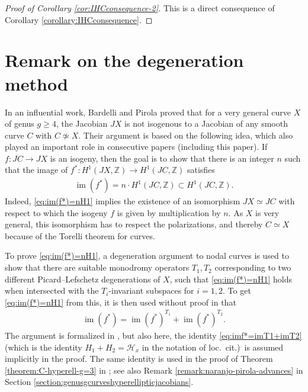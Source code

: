 \documentclass[a4paper,11pt,reqno]{amsart}
\numberwithin{equation}{section}
\theoremstyle{plain}
\theoremstyle{definition}
\newcommand{\Z}{\mathbb Z}
\newcommand{\im}{\operatorname{im}}
\renewcommand{\cong}{\simeq}
\begin{document}
\begin{proof}[Proof of Corollary \ref{cor:IHCconsequence-2}]
    This is a direct consequence of Corollary \ref{corollary:IHCconsequence}.
\end{proof}

\appendix

\section{Remark on the degeneration method} 

\label{appendix}

In an influential work, Bardelli and Pirola \cite{bardellipirola-curvesofgenusg} proved that for a very general curve $X$ of genus $g\geq 4$, the Jacobian $JX$ is not isogenous to a Jacobian of any smooth curve $C$ with $C\not \cong X$.
Their argument is based on the following idea, which also played an important role in consecutive papers (including this paper). 
If $f \colon JC\to JX$ is an isogeny, then the goal is to show that there is an integer $n$ such that the image of $f^\ast \colon H^1(JX,\Z)\to H^1(JC,\Z)$ satisfies
\begin{align}\label{eq:im(f*)=nH1}
    \im(f^\ast)=n\cdot H^1(JC,\Z)\subset H^1(JC,\Z).
    \end{align}
Indeed, \eqref{eq:im(f*)=nH1} implies the existence of an isomorphism $JX\cong JC$ with respect to which the isogeny $f$ is given by multiplication by $n$. As $X$ is very general, this isomorphism has to respect the polarizations, and thereby $C \cong X$ because of the Torelli theorem for curves. 
 
    To prove \eqref{eq:im(f*)=nH1}, 
    a degeneration argument to nodal curves is used to show that there are suitable monodromy operators $T_1,T_2$ corresponding to two different Picard--Lefschetz degenerations of $X$, such that \eqref{eq:im(f*)=nH1} holds when intersected with the $T_i$-invariant subspaces for $i=1,2$.
    To get \eqref{eq:im(f*)=nH1} from this, it is then used without proof in \cite[Proposition 4.1.3]{bardellipirola-curvesofgenusg} that 
    \begin{align} \label{eq:imf*=imT1+imT2}     \im(f^\ast)=\im(f^\ast)^{T_1}+\im(f^\ast)^{T_2} .
    \end{align}
    The argument is formalized in \cite[Proposition 3.6]{marcucci-genusofcurves}, but also here, the identity \eqref{eq:imf*=imT1+imT2} (which is the identity $H_1+H_2=\mathcal H_x$ in the notation of loc.\ cit.)\ is assumed implicitly in the proof. 
The same identity is used 
in the proof of Theorem \ref{theorem:C-hyperell-g=3} in \cite{naranjopirola2018}; see also Remark \ref{remark:naranjo-pirola-advances} in Section \ref{section:genusgcurveshyperellipticjacobians}. 
\end{document}
